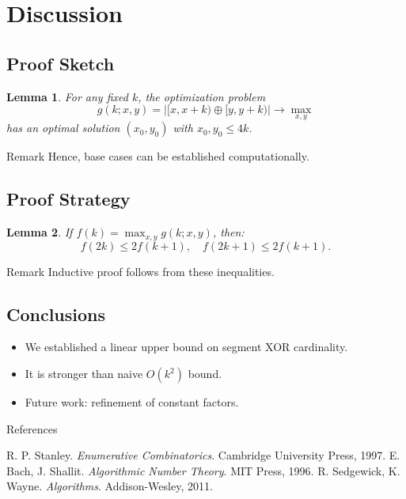 \documentclass[handout,notheorems]{beamer}
\newtheorem*{lemma}{Lemma}
\theoremstyle{definition}
\begin{document}
\section{Discussion}

\subsection{Proof Sketch}

\begin{frame}
    \begin{lemma}
        For any fixed $k$, the optimization problem \[ g(k; x, y) = |[x, x+k) \oplus [y, y+k)| \to \max_{x, y} \] has an optimal solution $(x_0, y_0)$ with $x_0, y_0 \leq 4k$.
    \end{lemma}
    \pause
    \begin{block}{Remark}
        Hence, base cases can be established computationally.
    \end{block}
\end{frame}

\subsection{Proof Strategy}

\begin{frame}
    \begin{lemma}
        If $f(k) = \max_{x, y} g(k; x, y)$, then:
        \[ f(2k) \le 2f(k+1), \quad f(2k+1) \le 2f(k+1). \]
    \end{lemma}
    \pause
    \begin{block}{Remark}
        Inductive proof follows from these inequalities.
    \end{block}
\end{frame}

\subsection{Conclusions}

\begin{frame}
    \begin{itemize}
        \item We established a linear upper bound on segment XOR cardinality.
        \item It is stronger than naive $O(k^2)$ bound.
        \item Future work: refinement of constant factors.
    \end{itemize}
\end{frame}

\begin{frame}{References}
    \begin{thebibliography}{9}
         R. P. Stanley. \emph{Enumerative Combinatorics}. Cambridge University Press, 1997.
         E. Bach, J. Shallit. \emph{Algorithmic Number Theory}. MIT Press, 1996.
         R. Sedgewick, K. Wayne. \emph{Algorithms}. Addison-Wesley, 2011.
    \end{thebibliography}
\end{frame}
\end{document}
